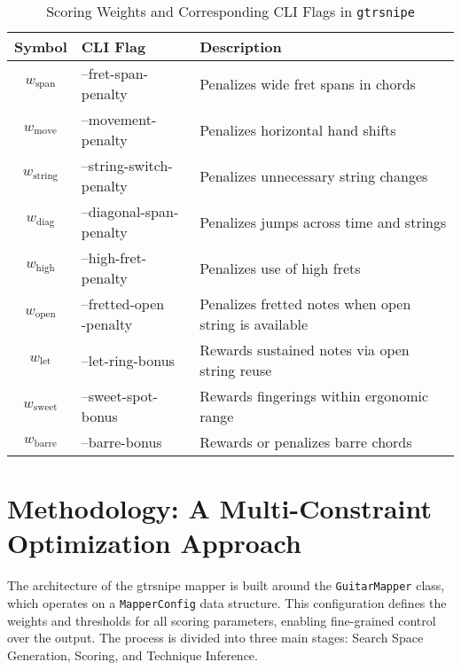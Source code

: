 \documentclass[conference]{IEEEtran}
\begin{document}
\begin{table}[htbp]
\caption{Scoring Weights and Corresponding CLI Flags in \texttt{gtrsnipe}}
\label{tab:score_weights}
\centering
\renewcommand{\arraystretch}{1.2}
\begin{tabularx}{\linewidth}{|c|>{\scriptsize\ttfamily}p{2.5cm}|X|}
\hline
\textbf{Symbol} & \textbf{CLI Flag} & \textbf{Description} \\
\hline
\( w_{\text{span}} \) & --fret-span-penalty & Penalizes wide fret spans in chords \\
\hline
\( w_{\text{move}} \) & --movement-penalty & Penalizes horizontal hand shifts \\
\hline
\( w_{\text{string}} \) & \makecell[tl]{--string-switch-\\penalty} & Penalizes unnecessary string changes \\
\hline
\( w_{\text{diag}} \) & \makecell[tl]{--diagonal-span-\\penalty} & Penalizes jumps across time and strings \\
\hline
\( w_{\text{high}} \) & --high-fret-penalty & Penalizes use of high frets \\
\hline
\( w_{\text{open}} \) & \makecell[tl]{--fretted-open\\-penalty} & Penalizes fretted notes when open string is available \\
\hline
\( w_{\text{let}} \) & --let-ring-bonus & Rewards sustained notes via open string reuse \\
\hline
\( w_{\text{sweet}} \) & --sweet-spot-bonus & Rewards fingerings within ergonomic range \\
\hline
\( w_{\text{barre}} \) & --barre-bonus & Rewards or penalizes barre chords \\
\hline
\end{tabularx}
\end{table}




\section{Methodology: A Multi-Constraint Optimization Approach}

The architecture of the gtrsnipe mapper is built around the \texttt{GuitarMapper} class, which operates on a \texttt{MapperConfig} data structure. This configuration defines the weights and thresholds for all scoring parameters, enabling fine-grained control over the output. The process is divided into three main stages: Search Space Generation, Scoring, and Technique Inference.
\end{document}

